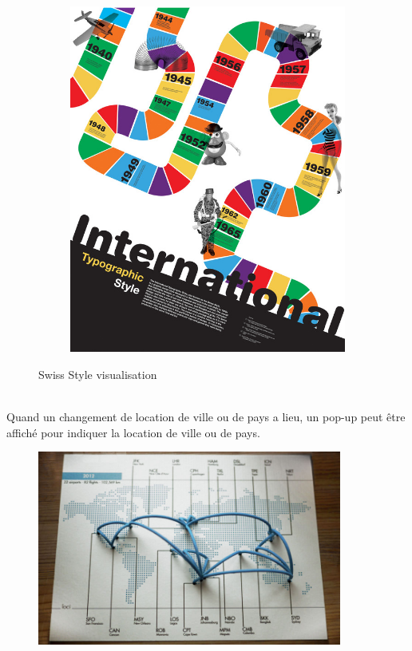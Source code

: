 \documentclass{article}
\begin{document}
\begin{figure}[h!]
\begin{subfigure}{.3\textwidth}
\end{subfigure}
\begin{subfigure}{.3\textwidth}
  \centering
  \includegraphics[width=1\linewidth]{SWISS3.jpg}
\end{subfigure}
  \caption{Swiss Style visualisation}
\end{figure}

\ \\Quand un changement de location de ville ou de pays a lieu, un pop-up peut être affiché pour indiquer la location de ville ou de pays.

\newpage
\begin{figure}[h!]
\centering
\includegraphics[width=100mm]{TRAVEL.png}
\end{figure}
\end{document}
